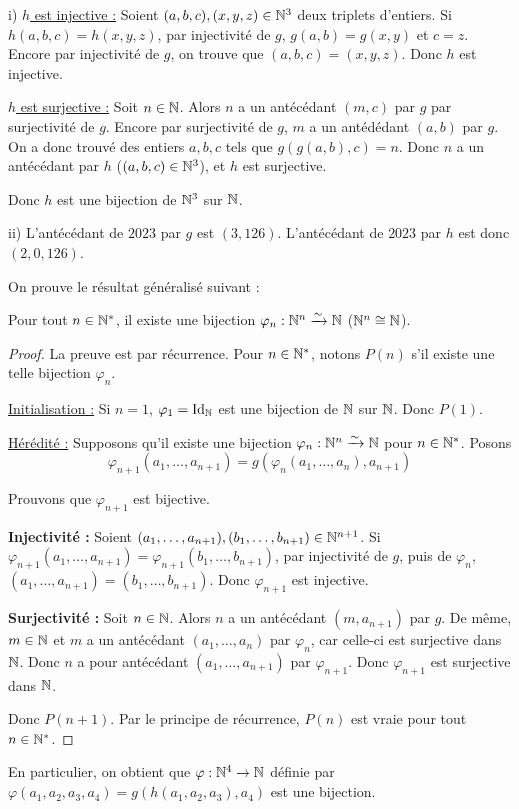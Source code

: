 \documentclass[]{../templates/homework}
\begin{document}
\question i)
\underline{$h$ est injective :}
Soient $(a,b,c), (x,y,z) \in \mathbb N^{3}$ deux triplets d'entiers. Si $h(a,b,c) = h(x,y,z)$, par injectivité de $g$, $g(a,b) = g(x,y)$ et $c = z$. Encore par injectivité de $g$, on trouve que $(a,b,c) = (x,y,z)$. Donc $h$ est injective.

\underline{$h$ est surjective :}
Soit $n\in\mathbb N$. Alors $n$ a un antécédant $(m,c)$ par $g$ par surjectivité de $g$. Encore par surjectivité de $g$, $m$ a un antédédant $(a,b)$ par $g$. On a donc trouvé des entiers $a,b,c$ tels que $g(g(a,b),c) = n$. Donc $n$ a un antécédant par $h$ ($(a,b,c) \in \mathbb N^3$), et $h$ est surjective.

Donc $h$ est une bijection de $\mathbb N^{3}$ sur $\mathbb N$.

ii) L'antécédant de $2023$ par $g$ est $(3, 126)$. L'antécédant de $2023$ par $h$ est donc $(2,0,126)$.

\question
On prouve le résultat généralisé suivant :
\begin{thm}
  Pour tout $n\in\mathbb N^{*}$, il existe une bijection $\varphi_{n}: \mathbb N^{n}\xrightarrow{\sim} \mathbb N$ ($\mathbb N^{n} \cong \mathbb N$).
\end{thm}
\begin{proof}
  La preuve est par récurrence. Pour $n\in\mathbb N^{*}$, notons $P(n)$ s'il existe une telle bijection $\varphi_{n}$.

  \underline{Initialisation :} Si $n=1$, $\varphi_{1} = \mathrm{Id}_{\mathbb N}$ est une bijection de $\mathbb N$ sur $\mathbb N$. Donc $P(1)$.

  \underline{Hérédité :} Supposons qu'il existe une bijection $\varphi_{n}: \mathbb N^{n}\xrightarrow{\sim} \mathbb N$ pour $n\in\mathbb N^{*}$. Posons $$\varphi_{n+1}(a_{1},\dots,a_{n+1}) = g\left(\varphi_{n}(a_{1}, \dots, a_{n}), a_{n+1}\right)$$

  Prouvons que $\varphi_{n+1}$ est bijective.

  \textbf{Injectivité :} Soient $(a_{1},\dots, a_{n+1}), (b_{1},\dots, b_{n+1})\in\mathbb N^{n+1}$. Si $\varphi_{n+1}(a_{1},\dots,a_{n+1}) = \varphi_{n+1}(b_{1},\dots,b_{n+1})$, par injectivité de $g$, puis de $\varphi_{n}$, $(a_{1},\dots, a_{n+1}) = (b_{1},\dots, b_{n+1})$. Donc $\varphi_{n+1}$ est injective.

  \textbf{Surjectivité :} Soit $n\in\mathbb N$. Alors $n$ a un antécédant $(m, a_{n+1})$ par $g$. De même, $m \in \mathbb N$ et $m$ a un antécédant $(a_{1}, \dots, a_{n})$ par $\varphi_{n}$, car celle-ci est surjective dans $\mathbb N$. Donc $n$ a pour antécédant $(a_{1}, \dots, a_{n+1})$ par $\varphi_{n+1}$. Donc $\varphi_{n+1}$ est surjective dans $\mathbb N$.

  Donc $P(n+1)$. Par le principe de récurrence, $P(n)$ est vraie pour tout $n\in \mathbb N^{*}$.
\end{proof}
En particulier, on obtient que $\varphi: \mathbb N^{4} \rightarrow \mathbb N$ définie par $\varphi(a_{1},a_{2},a_{3},a_{4}) = g(h(a_{1},a_{2},a_{3}),a_{4})$ est une bijection.
\end{document}
